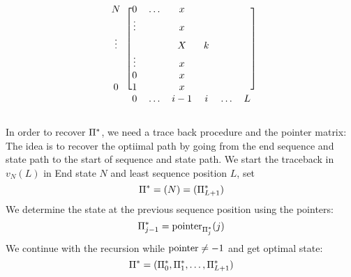 \begin{definition}
\[
\begin{blockarray}{ccccccc}
\begin{block}{c[cccccc]}
N      & 0      & \hdots & x   &   &        &  \\
       & \vdots &        & x   &   &        &  \\
\vdots &        &        & X   & k &        &  \\
       & \vdots &        & x   &   &        &  \\
       & 0      &        & x   &   &        &  \\
0      & 1      &        & x   &   &        &  \\
\end{block}
       & 0      & \hdots & i-1 & i & \hdots & L
\end{blockarray}
\]



In order to recover \(\Pi^*\), we need a trace back procedure and the pointer
matrix:
The idea is to recover the optiimal path by going from the end sequence and
state path to the start of sequence and state path.
We start the traceback in \(v_N(L)\) in End state \(N\) and least sequence
position \(L\), set
\[
    \Pi^* = (N) = (\Pi^*_{L+1})
\]
We determine the state at the previous sequence position using the pointers:
\[
    \Pi^*_{j-1} = \text{pointer}_{\Pi^*_j} (j)
\]
We continue with the recursion while \(\text{pointer}\neq -1\) and get optimal state:
\[
    \Pi^* = (\Pi^*_0, \Pi^*_1,\dotsc,\Pi^*_{L+1})
\]
\end{definition}


